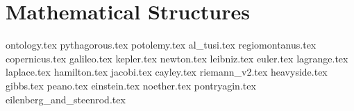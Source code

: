 \part{Mathematical Structures}

{ontology.tex}
{pythagorous.tex}
{potolemy.tex}
{al_tusi.tex}
{regiomontanus.tex}
{copernicus.tex}
{galileo.tex}
{kepler.tex}
{newton.tex}
{leibniz.tex}
{euler.tex}
{lagrange.tex}
{laplace.tex}
{hamilton.tex}
{jacobi.tex}
{cayley.tex}
{riemann_v2.tex}
{heavyside.tex}
{gibbs.tex}
{peano.tex}
{einstein.tex}
{noether.tex}
{pontryagin.tex}
{eilenberg_and_steenrod.tex}